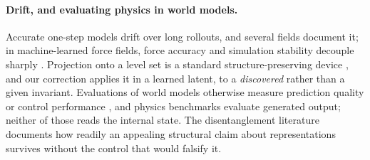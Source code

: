 \paragraph{Drift, and evaluating physics in world models.}
Accurate one-step models drift over long rollouts, and several fields document it; in
machine-learned force fields, force accuracy and simulation stability decouple sharply
\citep{fu2023forces}. Projection onto a level set is a standard structure-preserving device
\citep{hairer2006geometric2}, and our correction applies it in a learned latent, to a
\emph{discovered} rather than a given invariant. Evaluations of world models otherwise measure
prediction quality or control performance
\citep{hafner2023dreamerv3,ha2018world,schrittwieser2020muzero}, and physics benchmarks evaluate
generated output; neither of those reads the internal state. The disentanglement literature
\citep{locatello2019challenging} documents how readily an appealing structural claim about
representations survives without the control that would falsify it.
